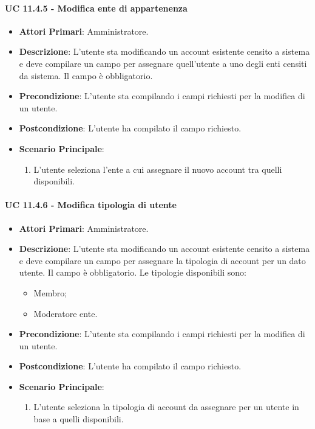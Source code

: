 				\paragraph{UC 11.4.5 - Modifica ente di appartenenza}
				\begin{itemize}
					\item \textbf{Attori Primari}: Amministratore.
					\item \textbf{Descrizione}: L'utente sta modificando un account esistente censito a sistema e deve compilare un campo per assegnare quell'utente a uno degli enti censiti da sistema. Il campo è obbligatorio.
					\item \textbf{Precondizione}: L'utente sta compilando i campi richiesti per la modifica di un utente.
					\item \textbf{Postcondizione}: L'utente ha compilato il campo richiesto.
					\item \textbf{Scenario Principale}:
					\begin{enumerate}
						\item{L'utente seleziona l'ente a cui assegnare il nuovo account tra quelli disponibili.}
					\end{enumerate}	
				\end{itemize}

				\paragraph{UC 11.4.6 - Modifica tipologia di utente}
				\begin{itemize}
					\item \textbf{Attori Primari}: Amministratore.
					\item \textbf{Descrizione}: L'utente sta modificando un account esistente censito a sistema e deve compilare un campo per assegnare la tipologia di account per un dato utente. Il campo è obbligatorio. Le tipologie disponibili sono:
					\begin{itemize}
						\item Membro;
						\item Moderatore ente.
					\end{itemize}
					\item \textbf{Precondizione}: L'utente sta compilando i campi richiesti per la modifica di un utente.
					\item \textbf{Postcondizione}: L'utente ha compilato il campo richiesto.
					\item \textbf{Scenario Principale}:
					\begin{enumerate}
						\item{L'utente seleziona la tipologia di account da assegnare per un utente in base a quelli disponibili.}
					\end{enumerate}	
				\end{itemize}

